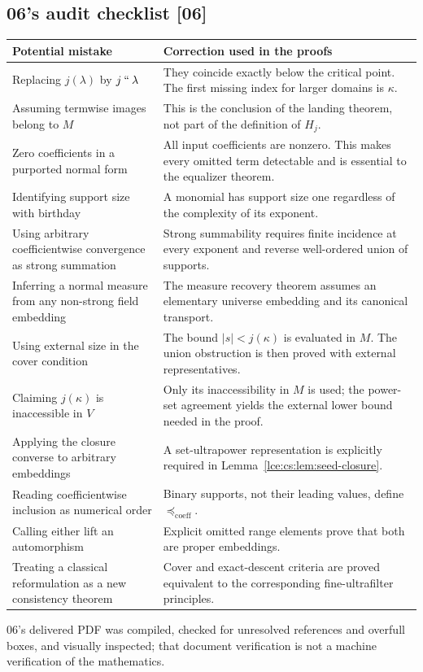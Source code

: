 \documentclass[11pt,letterpaper]{article}
\numberwithin{equation}{section}
\theoremstyle{definition}
\theoremstyle{remark}
\newcommand{\imset}[2]{#1\mathbin{``}#2}
\newcommand{\abs}[1]{\lvert#1\rvert}
\newcommand{\leref}[1]{Lemma~\ref{#1}}
\newcommand{\src}[1]{\textup{\textsf{\small[#1]}}}%
\newcommand{\lecoeff}{\preccurlyeq_{\mathrm{coeff}}}
\begin{document}
\subsection{06's audit checklist \src{06}}
\begin{center}\small
\begin{longtable}{@{}P{0.32\textwidth}P{0.62\textwidth}@{}}
\toprule
Potential mistake & Correction used in the proofs\\
\midrule\endhead
Replacing $j(\lambda)$ by $\imset j\lambda$
 & They coincide exactly below the critical point. The first missing index
   for larger domains is $\kappa$.\\[5pt]
Assuming termwise images belong to $M$
 & This is the conclusion of the landing theorem, not part of the
   definition of $H_j$.\\[5pt]
Zero coefficients in a purported normal form
 & All input coefficients are nonzero. This makes every omitted term
   detectable and is essential to the equalizer theorem.\\[5pt]
Identifying support size with birthday
 & A monomial has support size one regardless of the complexity of its
   exponent.\\[5pt]
Using arbitrary coefficientwise convergence as strong summation
 & Strong summability requires finite incidence at every exponent and
   reverse well-ordered union of supports.\\[5pt]
Inferring a normal measure from any non-strong field embedding
 & The measure recovery theorem assumes an elementary universe embedding and
   its canonical transport.\\[5pt]
Using external size in the cover condition
 & The bound $\abs s<j(\kappa)$ is evaluated in $M$. The union obstruction is
   then proved with external representatives.\\[5pt]
Claiming $j(\kappa)$ is inaccessible in $V$
 & Only its inaccessibility in $M$ is used; the power-set agreement yields
   the external lower bound needed in the proof.\\[5pt]
Applying the closure converse to arbitrary embeddings
 & A set-ultrapower representation is explicitly required in
   \leref{lce:cs:lem:seed-closure}.\\[5pt]
Reading coefficientwise inclusion as numerical order
 & Binary supports, not their leading values, define $\lecoeff$.\\[5pt]
Calling either lift an automorphism
 & Explicit omitted range elements prove that both are proper
   embeddings.\\[5pt]
Treating a classical reformulation as a new consistency theorem
 & Cover and exact-descent criteria are proved equivalent to the
   corresponding fine-ultrafilter principles.\\
\bottomrule
\end{longtable}
\end{center}
06's delivered PDF was compiled, checked for unresolved references and
overfull boxes, and visually inspected; that document verification is not a
machine verification of the mathematics.
\end{document}
